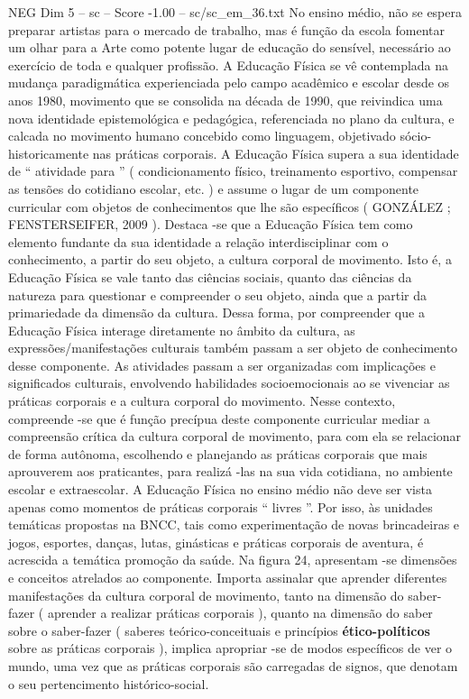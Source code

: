 \begin{textsample}{NEG Dim 5 – sc – Score -1.00 – sc/sc\_em\_36.txt}
No ensino médio, não se espera preparar artistas para o mercado de trabalho, mas é função da escola fomentar um olhar para a Arte como potente lugar de educação do sensível, necessário ao exercício de toda e qualquer profissão.
A Educação Física se vê contemplada na mudança paradigmática experienciada pelo campo acadêmico e escolar desde os anos 1980, movimento que se consolida na década de 1990, que reivindica uma nova identidade epistemológica e pedagógica, referenciada no plano da cultura, e calcada no movimento humano concebido como linguagem, objetivado sócio-historicamente nas práticas corporais.
A Educação Física supera a sua identidade de “ atividade para ” ( condicionamento físico, treinamento esportivo, compensar as tensões do cotidiano escolar, etc. ) e assume o lugar de um componente curricular com objetos de conhecimentos que lhe são específicos ( GONZÁLEZ ; FENSTERSEIFER, 2009 ).
Destaca -se que a Educação Física tem como elemento fundante da sua identidade a relação interdisciplinar com o conhecimento, a partir do seu objeto, a cultura corporal de movimento.
Isto é, a Educação Física se vale tanto das ciências sociais, quanto das ciências da natureza para questionar e compreender o seu objeto, ainda que a partir da primariedade da dimensão da cultura.
Dessa forma, por compreender que a Educação Física interage diretamente no âmbito da cultura, as expressões/manifestações culturais também passam a ser objeto de conhecimento desse componente.
As atividades passam a ser organizadas com implicações e significados culturais, envolvendo habilidades socioemocionais ao se vivenciar as práticas corporais e a cultura corporal do movimento.
Nesse contexto, compreende -se que é função precípua deste componente curricular mediar a compreensão crítica da cultura corporal de movimento, para com ela se relacionar de forma autônoma, escolhendo e planejando as práticas corporais que mais aprouverem aos praticantes, para realizá -las na sua vida cotidiana, no ambiente escolar e extraescolar.
A Educação Física no ensino médio não deve ser vista apenas como momentos de práticas corporais “ livres ”.
Por isso, às unidades temáticas propostas na BNCC, tais como experimentação de novas brincadeiras e jogos, esportes, danças, lutas, ginásticas e práticas corporais de aventura, é acrescida a temática promoção da saúde.
Na figura 24, apresentam -se dimensões e conceitos atrelados ao componente.
Importa assinalar que aprender diferentes manifestações da cultura corporal de movimento, tanto na dimensão do saber-fazer ( aprender a realizar práticas corporais ), quanto na dimensão do saber sobre o saber-fazer ( saberes teórico-conceituais e princípios \textbf{ético-políticos} sobre as práticas corporais ), implica apropriar -se de modos específicos de ver o mundo, uma vez que as práticas corporais são carregadas de signos, que denotam o seu pertencimento histórico-social.

\end{textsample}
